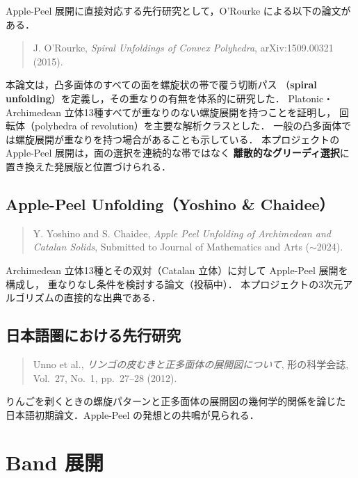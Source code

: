\documentclass[a4paper,11pt]{article}
\begin{document}
Apple-Peel 展開に直接対応する先行研究として，O'Rourke による以下の論文がある．

\begin{quotation}\noindent
  J. O'Rourke,
  \textit{Spiral Unfoldings of Convex Polyhedra},
  arXiv:1509.00321 (2015).
\end{quotation}

本論文は，凸多面体のすべての面を螺旋状の帯で覆う切断パス
（\textbf{spiral unfolding}）を定義し，その重なりの有無を体系的に研究した．
Platonic・Archimedean 立体13種すべてが重なりのない螺旋展開を持つことを証明し，
回転体（polyhedra of revolution）を主要な解析クラスとした．
一般の凸多面体では螺旋展開が重なりを持つ場合があることも示している．
本プロジェクトの Apple-Peel 展開は，面の選択を連続的な帯ではなく
\textbf{離散的なグリーディ選択}に置き換えた発展版と位置づけられる．

\subsection{Apple-Peel Unfolding（Yoshino \& Chaidee）}

\begin{quotation}\noindent
  Y. Yoshino and S. Chaidee,
  \textit{Apple Peel Unfolding of Archimedean and Catalan Solids},
  Submitted to Journal of Mathematics and Arts ($\sim$2024).
\end{quotation}

Archimedean 立体13種とその双対（Catalan 立体）に対して Apple-Peel 展開を構成し，
重なりなし条件を検討する論文（投稿中）．
本プロジェクトの3次元アルゴリズムの直接的な出典である．

\subsection{日本語圏における先行研究}

\begin{quotation}\noindent
  Unno et al.,
  \textit{リンゴの皮むきと正多面体の展開図について},
  形の科学会誌, Vol.~27, No.~1, pp.~27--28 (2012).
\end{quotation}

りんごを剥くときの螺旋パターンと正多面体の展開図の幾何学的関係を論じた
日本語初期論文．Apple-Peel の発想との共鳴が見られる．

\section{Band 展開}
\end{document}
